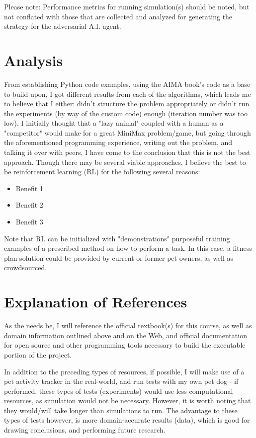 \documentclass{article}
\begin{document}
Please note: Performance metrics for running simulation(s) should be noted, but not conflated with those that are collected and analyzed for generating the strategy for the adversarial A.I. agent.

\section{Analysis}

From establishing Python code examples, using the AIMA book's code as a base to build upon, I got different results from each of the algorithms, which leads me to believe that I either: didn't structure the problem appropriately or didn't run the experiments (by way of the custom code) enough (iteration number was too low). I initially thought that a "lazy animal" coupled with a human as a "competitor" would make for a great MiniMax problem/game, but going through the aforementioned programming experience, writing out the problem, and talking it over with peers, I have come to the conclusion that this is not the best approach. Though there may be several viable approaches, I believe the best to be reinforcement learning (RL) for the following several reasons:

\begin{itemize}
  \item Benefit 1
  \item Benefit 2
  \item Benefit 3
\end{itemize}

Note that RL can be initialized with "demonstrations" purposeful training examples of a prescribed method on how to perform a task. In this case, a fitness plan solution could be provided by current or former pet owners, as well as crowdsourced.
  
\section{Explanation of References}
As the needs be, I will reference the official textbook(s) for this course, as well as domain information outlined above and on the Web, and official documentation for open source and other programming tools necessary to build the executable portion of the project.

In addition to the preceding types of resources, if possible, I will make use of a pet activity tracker in the real-world, and run tests with my own pet dog - if performed, these types of tests (experiments) would use less computational resources, as simulation would not be necessary. However, it is worth noting that they would/will take longer than simulations to run. The advantage to these types of tests however, is more domain-accurate results (data), which is good for drawing conclusions, and performing future research.

\newpage

\raggedright

\end{document}
